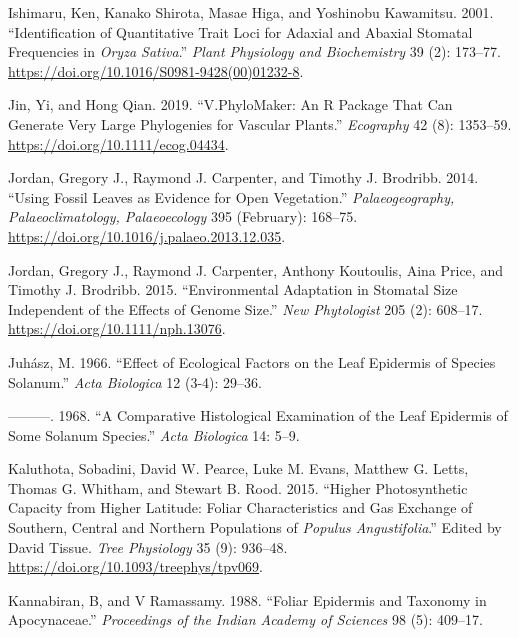 \documentclass[
  12pt,
]{article}
\newlength{\cslhangindent}
\newlength{\cslentryspacingunit} %
\newenvironment{CSLReferences}[2] %
 {%
  \setlength{\parindent}{0pt}
  \ifodd #1
  \let\oldpar\par
  \def\par{\hangindent=\cslhangindent\oldpar}
  \fi
  \setlength{\parskip}{#2\cslentryspacingunit}
 }%
 {}
\begin{document}
\begin{CSLReferences}{1}{0}
\leavevmode{}%
Ishimaru, Ken, Kanako Shirota, Masae Higa, and Yoshinobu Kawamitsu. 2001. {``Identification of Quantitative Trait Loci for Adaxial and Abaxial Stomatal Frequencies in \emph{{Oryza} Sativa}.''} \emph{Plant Physiology and Biochemistry} 39 (2): 173--77. \url{https://doi.org/10.1016/S0981-9428(00)01232-8}.

\leavevmode{}%
Jin, Yi, and Hong Qian. 2019. {``V.{PhyloMaker}: An {R} Package That Can Generate Very Large Phylogenies for Vascular Plants.''} \emph{Ecography} 42 (8): 1353--59. \url{https://doi.org/10.1111/ecog.04434}.

\leavevmode{}%
Jordan, Gregory J., Raymond J. Carpenter, and Timothy J. Brodribb. 2014. {``Using Fossil Leaves as Evidence for Open Vegetation.''} \emph{Palaeogeography, Palaeoclimatology, Palaeoecology} 395 (February): 168--75. \url{https://doi.org/10.1016/j.palaeo.2013.12.035}.

\leavevmode{}%
Jordan, Gregory J., Raymond J. Carpenter, Anthony Koutoulis, Aina Price, and Timothy J. Brodribb. 2015. {``Environmental Adaptation in Stomatal Size Independent of the Effects of Genome Size.''} \emph{New Phytologist} 205 (2): 608--17. \url{https://doi.org/10.1111/nph.13076}.

\leavevmode{}%
Juhász, M. 1966. {``Effect of Ecological Factors on the Leaf Epidermis of Species {Solanum}.''} \emph{Acta Biologica} 12 (3-4): 29--36.

\leavevmode{}%
---------. 1968. {``A Comparative Histological Examination of the Leaf Epidermis of Some {Solanum} Species.''} \emph{Acta Biologica} 14: 5--9.

\leavevmode{}%
Kaluthota, Sobadini, David W. Pearce, Luke M. Evans, Matthew G. Letts, Thomas G. Whitham, and Stewart B. Rood. 2015. {``Higher Photosynthetic Capacity from Higher Latitude: Foliar Characteristics and Gas Exchange of Southern, Central and Northern Populations of \emph{{Populus} Angustifolia}.''} Edited by David Tissue. \emph{Tree Physiology} 35 (9): 936--48. \url{https://doi.org/10.1093/treephys/tpv069}.

\leavevmode{}%
Kannabiran, B, and V Ramassamy. 1988. {``Foliar Epidermis and Taxonomy in {Apocynaceae}.''} \emph{Proceedings of the Indian Academy of Sciences} 98 (5): 409--17.


\end{CSLReferences}
\end{document}
